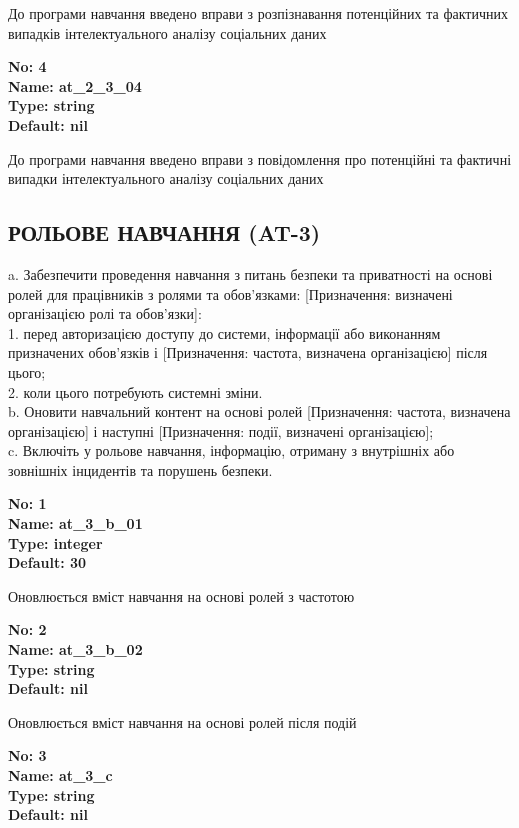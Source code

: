 \documentclass{article}
\begin{document}
{\footnotesize До програми навчання введено вправи з розпізнавання потенційних та фактичних випадків інтелектуального аналізу соціальних даних}


{\footnotesize\bfseries
No: 4\\
Name: at\_\allowbreak{}2\_\allowbreak{}3\_\allowbreak{}04\\
Type: string\\
Default: nil
}

{\footnotesize До програми навчання введено вправи з повідомлення про потенційні та фактичні випадки інтелектуального аналізу соціальних даних}




\subsection{РОЛЬОВЕ НАВЧАННЯ (AT-3)}
a. Забезпечити проведення навчання з питань безпеки та приватності на основі ролей для працівників з ролями та обов'язками: [Призначення: визначені організацією ролі та обов'язки]:\\ 
1. перед авторизацією доступу до системи, інформації або виконанням призначених обов'язків і [Призначення: частота, визначена організацією] після цього;\\ 
2. коли цього потребують системні зміни.\\ 
b. Оновити навчальний контент на основі ролей [Призначення: частота, визначена організацією] і наступні [Призначення: події, визначені організацією];\\ 
c. Включіть у рольове навчання, інформацію, отриману з внутрішніх або зовнішніх інцидентів та порушень безпеки.

\vspace{10pt}
{\footnotesize\bfseries
No: 1\\
Name: at\_\allowbreak{}3\_\allowbreak{}b\_\allowbreak{}01\\
Type: integer\\
Default: 30
}

{\footnotesize Оновлюється вміст навчання на основі ролей з частотою}


{\footnotesize\bfseries
No: 2\\
Name: at\_\allowbreak{}3\_\allowbreak{}b\_\allowbreak{}02\\
Type: string\\
Default: nil
}

{\footnotesize Оновлюється вміст навчання на основі ролей після подій}


{\footnotesize\bfseries
No: 3\\
Name: at\_\allowbreak{}3\_\allowbreak{}c\\
Type: string\\
Default: nil
}
\end{document}
